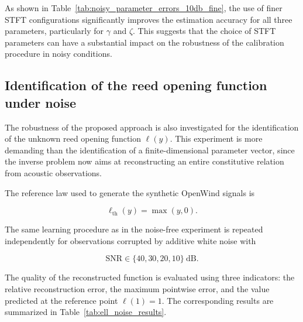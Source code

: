 \documentclass[11pt,a4paper]{report}
\theoremstyle{plain}
\theoremstyle{definition}
\begin{document}
As shown in Table~\ref{tab:noisy_parameter_errors_10db_fine}, the use of finer STFT configurations significantly improves the estimation accuracy for all three parameters, particularly for \(\gamma\) and \(\zeta\). 
This suggests that the choice of STFT parameters can have a substantial impact on the robustness of the calibration procedure in noisy conditions.


\subsection{Identification of the reed opening function under noise}
\label{subsec:ell_noise}

The robustness of the proposed approach is also investigated for the
identification of the unknown reed opening function $\ell(y)$. This experiment
is more demanding than the identification of a finite-dimensional parameter
vector, since the inverse problem now aims at reconstructing an entire
constitutive relation from acoustic observations.

The reference law used to generate the synthetic OpenWind signals is

\begin{equation}
\ell_{\mathrm{th}}(y)
=
\max(y,0).
\label{eq:ell_theoretical_noise}
\end{equation}

The same learning procedure as in the noise-free experiment is repeated
independently for observations corrupted by additive white noise with

\begin{equation}
\mathrm{SNR}
\in
\{40,30,20,10\}\ \mathrm{dB}.
\end{equation}

The quality of the reconstructed function is evaluated using three indicators:
the relative reconstruction error, the maximum pointwise error, and the value
predicted at the reference point $\ell(1)=1$. The corresponding results are
summarized in Table~\ref{tab:ell_noise_results}.
\end{document}
